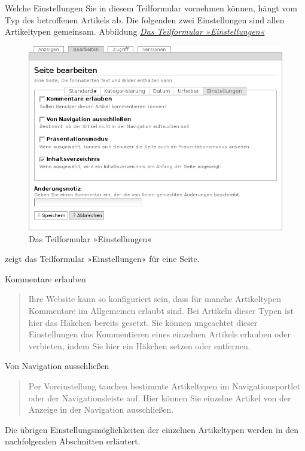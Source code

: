 \documentclass[a4paper,12pt,ngerman]{manual}
\begin{document}
Welche Einstellungen Sie in diesem Teilformular vornehmen können, hängt vom
Typ des betroffenen Artikels ab. Die folgenden zwei Einstellungen sind allen
Artikeltypen gemeinsam. Abbildung \hyperlink{fig-seite-bearbeiten-einstellungen}{\emph{Das Teilformular »Einstellungen«}}
\hypertarget{fig-seite-bearbeiten-einstellungen}{}\begin{figure}[htbp]
\centering

\includegraphics{seite-bearbeiten-einstellungen.png}
\caption{Das Teilformular »Einstellungen«}\end{figure}

zeigt das Teilformular »Einstellungen« für eine Seite.

Kommentare erlauben
\begin{quote}

Ihre Website kann so konfiguriert sein, dass für
manche Artikeltypen Kommentare im Allgemeinen erlaubt sind. Bei Artikeln
dieser Typen ist hier das Häkchen bereits gesetzt. Sie können ungeachtet
dieser Einstellungen das Kommentieren eines einzelnen Artikels erlauben oder
verbieten, indem Sie hier ein Häkchen setzen oder entfernen.
\end{quote}

Von Navigation ausschließen
\begin{quote}

Per Voreinstellung tauchen bestimmte
Artikeltypen im Navigationsportlet oder der Navigationsleiste auf. Hier
können Sie einzelne Artikel von der Anzeige in der Navigation ausschließen.
\end{quote}

Die übrigen Einstellungsmöglichkeiten der einzelnen Artikeltypen werden in den
nachfolgenden Abschnitten erläutert.
\end{document}
